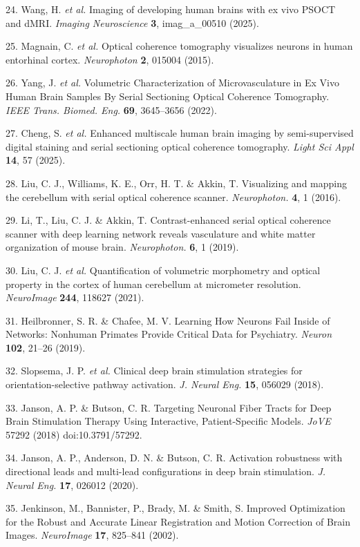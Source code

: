 \documentclass{article}
\begin{document}
\begin{hangpars}
24. Wang, H. \emph{et al.} Imaging of developing human brains with ex vivo PSOCT and dMRI. \emph{Imaging Neuroscience} \textbf{3}, imag\_a\_00510 (2025).

25. Magnain, C. \emph{et al.} Optical coherence tomography visualizes neurons in human entorhinal cortex. \emph{Neurophoton} \textbf{2}, 015004 (2015).

26. Yang, J. \emph{et al.} Volumetric Characterization of Microvasculature in Ex Vivo Human Brain Samples By Serial Sectioning Optical Coherence Tomography. \emph{IEEE Trans. Biomed. Eng.} \textbf{69}, 3645–3656 (2022).

27. Cheng, S. \emph{et al.} Enhanced multiscale human brain imaging by semi-supervised digital staining and serial sectioning optical coherence tomography. \emph{Light Sci Appl} \textbf{14}, 57 (2025).

28. Liu, C. J., Williams, K. E., Orr, H. T. \& Akkin, T. Visualizing and mapping the cerebellum with serial optical coherence scanner. \emph{Neurophoton.} \textbf{4}, 1 (2016).

29. Li, T., Liu, C. J. \& Akkin, T. Contrast-enhanced serial optical coherence scanner with deep learning network reveals vasculature and white matter organization of mouse brain. \emph{Neurophoton.} \textbf{6}, 1 (2019).

30. Liu, C. J. \emph{et al.} Quantification of volumetric morphometry and optical property in the  cortex of human cerebellum at micrometer resolution. \emph{NeuroImage} \textbf{244}, 118627 (2021).

31. Heilbronner, S. R. \& Chafee, M. V. Learning How Neurons Fail Inside of Networks: Nonhuman Primates Provide Critical Data for Psychiatry. \emph{Neuron} \textbf{102}, 21–26 (2019).

32. Slopsema, J. P. \emph{et al.} Clinical deep brain stimulation strategies for orientation-selective pathway activation. \emph{J. Neural Eng.} \textbf{15}, 056029 (2018).

33. Janson, A. P. \& Butson, C. R. Targeting Neuronal Fiber Tracts for Deep Brain Stimulation Therapy Using Interactive, Patient-Specific Models. \emph{JoVE} 57292 (2018) doi:10.3791/57292.

34. Janson, A. P., Anderson, D. N. \& Butson, C. R. Activation robustness with directional leads and multi-lead configurations in deep brain stimulation. \emph{J. Neural Eng.} \textbf{17}, 026012 (2020).

35. Jenkinson, M., Bannister, P., Brady, M. \& Smith, S. Improved Optimization for the Robust and Accurate Linear Registration and Motion Correction of Brain Images. \emph{NeuroImage} \textbf{17}, 825–841 (2002).


\end{hangpars}
\end{document}
